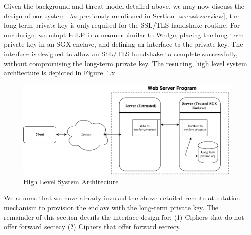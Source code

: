 \documentclass[../../main.tex]{subfiles}
\begin{document}
Given the background and threat model detailed above, we may now
discuss the design of our system. As previously mentioned in
Section~\ref{sec:ssloverview}, the long-term private key is only
required for the SSL/TLS handshake routine. For our design, we adopt
PoLP in a manner similar to Wedge, placing the long-term private key
in an SGX enclave, and defining an interface to the private key. The
interface is designed to allow an SSL/TLS handshake to complete
successfully, without compromising the long-term private key. The
resulting, high level system architecture is depicted in
Figure~\ref{fig:sysarch}.x

\begin{figure}[H]
  \centering
  \includegraphics[scale=0.4]{images/high-level-arch.pdf}
  \caption{High Level System Architecture}
  \label{fig:sysarch}
\end{figure}

We assume that we have already invoked the above-detailed
remote-attestation mechanism to provision the enclave with the
long-term private key. The remainder of this section details the
interface design for: (1) Ciphers that do not offer forward secrecy
(2) Ciphers that offer forward secrecy.

\end{document}
